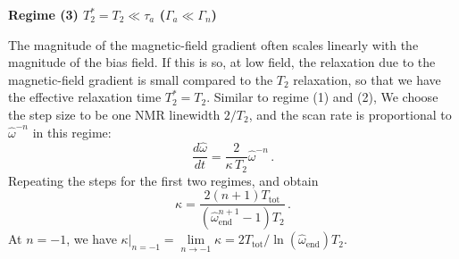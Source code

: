 \documentclass{WileyMSP-template}
\begin{document}
	
	
	\textbf{Regime (3) $T_2^*=T_2 \ll \tau_a$ ($\Gamma_a\ll\Gamma_n$)}

	The magnitude of the magnetic-field gradient often scales linearly with the magnitude of the bias field. 
	If this is so, at low field, the relaxation due to the magnetic-field gradient is small compared to the $T_2$ relaxation, so that we have the effective relaxation time $T_2^*=T_2$. 
	Similar to regime (1) and (2), We choose the step size to be one NMR linewidth $2/T_2$, and the scan rate is proportional to $\hat{\omega}^{-n}$ in this regime:
	\begin{equation}
		\dfrac{d\hat{\omega}}{dt} =\dfrac{2}{\kappa\, T_2}  \hat{\omega}^{-n}
		\,.
	\end{equation}
	Repeating the steps for the first two regimes, and obtain
	\begin{equation}
		\kappa = \dfrac{2(n+1) T_{\mathrm{tot}}}{(\hat{\omega}_{\mathrm{end}}^{n+1}-1) T_2  }
		\,.\label{eq:kappa_regime4}
	\end{equation}
	At $n=-1$, we have $\kappa|_{n=-1} = \lim\limits_{n\to-1}\kappa = 2 T_{\mathrm{tot}}/\ln{(\hat{\omega}_{\mathrm{end}})}  T_2 $. 

	
	
	
	
\end{document}
